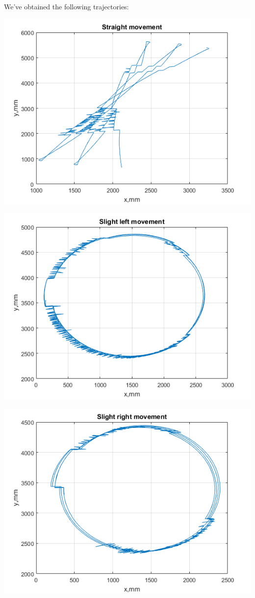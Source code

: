 \documentclass[a4paper, 12pt]{article}
\begin{document}
We've obtained the following trajectories:
\begin{center}
  \includegraphics[scale = 0.8]{s.png}
  
  \includegraphics[scale = 0.8]{l.png}
  
  \includegraphics[scale = 0.8]{r.png}
  

\end{center}
\end{document}

